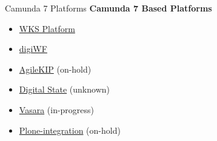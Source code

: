 \documentclass[12pt,aspectratio=169]{beamer}
\begin{document}
\begin{frame}{Camunda 7 Platforms}
\textbf{Camunda 7 Based Platforms}
\par
\vspace{0.5cm}
\par
\begin{minipage}{0.5\textwidth}
\begin{itemize}
    \item<1-> \href{https://www.wkspower.com/}{WKS Platform}
    \item<2-> \href{https://digiwf.oss.muenchen.de/}{digiWF}
    \item<3-> \href{https://github.com/AgileKip}{AgileKIP} (on-hold)
    \item<4-> \href{https://digitalstate.io/}{Digital State} (unknown)
    \item<4-> \href{https://gitlab.com/vasara-bpm/vasara}{Vasara} (in-progress)
    \item<4-> \href{https://datakurre.pandala.org/2022/10/collective-bpmproxy/}{Plone-integration} (on-hold)
\end{itemize}
\end{minipage}
\begin{minipage}{0.45\textwidth}
\end{minipage}
\end{frame}
\end{document}
